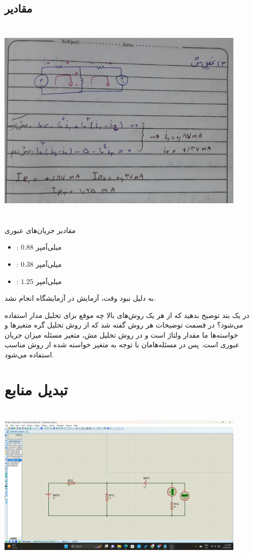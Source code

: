 \documentclass{article}
\begin{document}
		\subsection{مقادیر}	
		\begin{center}
			\includegraphics[width=12cm, height=10cm]{./images/3.}
		\end{center}
			مقادیر جریان‌های عبوری
			\begin{itemize}
				\item {}: $0.88$ میلی‌آمپر
				\item {}: $0.38$ میلی‌آمپر
				\item {}: $1.25$ میلی‌آمپر
			\end{itemize}
		به دلیل نبود وقت، آزمایش در آزمایشگاه انجام نشد.
		
		در یک بند توضیح بدهید که از هر یک روش‌های بالا چه موقع برای تحلیل مدار استفاده می‌شود؟
		در قسمت توضیحات هر روش گفته شد که از روش تحلیل گره متغیر‌ها و خواسته‌ها ما مقدار ولتاژ است و در روش تحلیل مش، متغیر مسئله میزان جریان عبوری است. پس در مسئله‌‌هامان با توجه به متغیر خواسته شده از روش مناسب استفاده می‌شود.
	\clearpage
	\section{تبدیل منابع}
		\begin{center}
			\includegraphics[width=12cm, height=8cm]{./images/3_2}
		\end{center}
		
\end{document}

